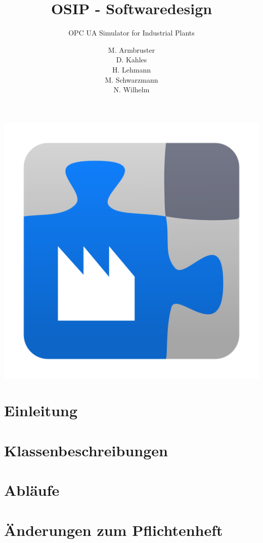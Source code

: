 \documentclass[parskip=full]{scrartcl}
\title{OSIP - Softwaredesign}
\subtitle{OPC UA Simulator for Industrial Plants}
\author{
    M. Armbruster\\
    D. Kahles\\
    H. Lehmann\\
    M. Schwarzmann\\
    N. Wilhelm
}
\begin{document}
\maketitle

\vspace{20px}
\begin{center}
  \includegraphics[scale=0.4]{../icon.png}
\end{center}
\pagebreak
\tableofcontents
\pagebreak

\section{Einleitung}

\section{Klassenbeschreibungen}

\section{Abläufe}

\section{Änderungen zum Pflichtenheft}
\end{document}
